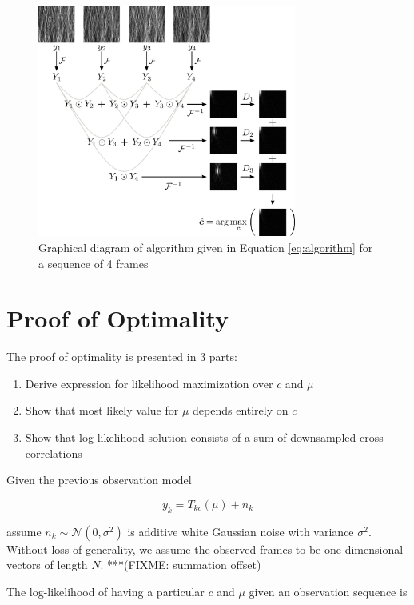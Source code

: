 \documentclass{article}
\begin{document}
\begin{figure}[htb]
  \begin{minipage}[b]{1\linewidth}
    \centering
    \centerline{\includegraphics[width=8.5cm]{images/algorithm.png}}
  \end{minipage}
  \caption{Graphical diagram of algorithm given in Equation \ref{eq:algorithm} for a sequence of 4 frames}
  \label{fig:algorithm}
\end{figure}

\section{Proof of Optimality}
\label{sec:optimality}

The proof of optimality is presented in 3 parts:

\begin{enumerate}
\item Derive expression for likelihood maximization over $c$ and $\mu$
\item Show that most likely value for $\mu$ depends entirely on $c$
\item Show that log-likelihood solution consists of a sum of downsampled cross correlations
\end{enumerate}

Given the previous observation model

$$y_k = T_{kc}(\mu) + n_k$$

assume $n_k \sim \mathcal{N}(0, \sigma^2)$ is additive white Gaussian noise with variance $\sigma^2$.  Without loss of generality, we assume the observed frames to be one dimensional vectors of length $N$. ***(FIXME: summation offset)

The log-likelihood of having a particular $c$ and $\mu$ given an observation sequence is
\end{document}
